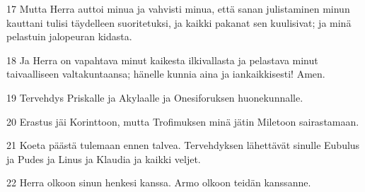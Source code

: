 \par 17 Mutta Herra auttoi minua ja vahvisti minua, että sanan julistaminen minun kauttani tulisi täydelleen suoritetuksi, ja kaikki pakanat sen kuulisivat; ja minä pelastuin jalopeuran kidasta.
\par 18 Ja Herra on vapahtava minut kaikesta ilkivallasta ja pelastava minut taivaalliseen valtakuntaansa; hänelle kunnia aina ja iankaikkisesti! Amen.
\par 19 Tervehdys Priskalle ja Akylaalle ja Onesiforuksen huonekunnalle.
\par 20 Erastus jäi Korinttoon, mutta Trofimuksen minä jätin Miletoon sairastamaan.
\par 21 Koeta päästä tulemaan ennen talvea. Tervehdyksen lähettävät sinulle Eubulus ja Pudes ja Linus ja Klaudia ja kaikki veljet.
\par 22 Herra olkoon sinun henkesi kanssa. Armo olkoon teidän kanssanne.


